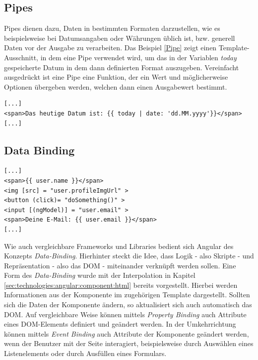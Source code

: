 \subsection{Pipes}
\label{sec:technologies:angular:pipe}

Pipes dienen dazu, Daten in bestimmten Formaten darzustellen, wie es beispielsweise bei Datumsangaben oder Währungen üblich ist\cite{Pipe}, bzw. generell Daten vor der Ausgabe zu verarbeiten. Das Beispiel \ref{Pipe} zeigt einen Template-Ausschnitt, in dem eine Pipe verwendet wird, um das in der Variablen \textit{today} gespeicherte Datum in dem dann definierten Format auszugeben. Vereinfacht ausgedrückt ist eine Pipe eine Funktion, der ein Wert und möglicherweise Optionen übergeben werden, welchen dann einen Ausgabewert bestimmt.
\begin{lstlisting}[float, floatplacement=h, style=htmlcssjs, caption={Beispiel für die Verwendung einer \textit{Pipe}}, label={Pipe}]
[...]
<span>Das heutige Datum ist: {{ today | date: 'dd.MM.yyyy'}}</span>
[...]
\end{lstlisting}

\subsection{Data Binding}
\label{sec:technologies:angular:data-binding}
\begin{lstlisting}[float, floatplacement=h, style=htmlcssjs, caption={Beispiele für \textit{Data-Binding}}, label={Data-Binding}]
[...]
<span>{{ user.name }}</span>
<img [src] = "user.profileImgUrl" >
<button (click)= "doSomething()" >
<input [(ngModel)] = "user.email" >
<span>Deine E-Mail: {{ user.email }}</span>
[...]
\end{lstlisting}
Wie auch vergleichbare Frameworks und Libraries bedient sich Angular des Konzepts \textit{Data-Binding}. Hierhinter steckt die Idee, dass Logik - also Skripte -  und Repräsentation - also das \acs{DOM} - miteinander verknüpft werden sollen. Eine Form des \textit{Data-Binding} wurde mit der Interpolation in Kapitel \ref{sec:technologies:angular:component:html} bereits vorgestellt. Hierbei werden Informationen aus der Komponente im zugehörigen Template dargestellt. Sollten sich die Daten der Komponente ändern, so aktualisiert sich auch automatisch das \acs{DOM}. Auf vergleichbare Weise können mittels \textit{Property Binding} auch Attribute eines \acs{DOM}-Elements definiert und geändert werden. In der Umkehrrichtung können mittels \textit{Event Binding} auch Attribute der Komponente geändert werden, wenn der Benutzer mit der Seite interagiert, beispielsweise durch Auswählen eines Listenelements oder durch Ausfüllen eines Formulars. 

